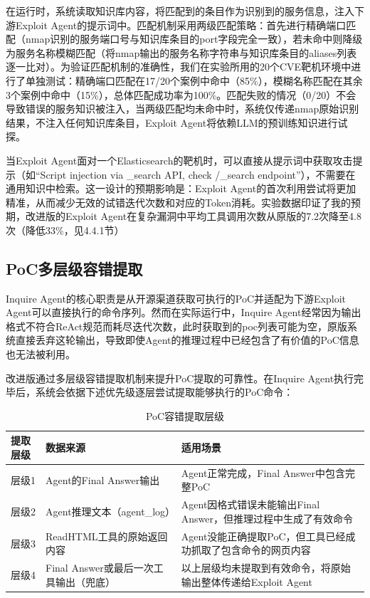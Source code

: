在运行时，系统读取知识库内容，将匹配到的条目作为识别到的服务信息，注入下游Exploit Agent的提示词中。匹配机制采用两级匹配策略：首先进行精确端口匹配（nmap识别的服务端口号与知识库条目的port字段完全一致），若未命中则降级为服务名称模糊匹配（将nmap输出的服务名称字符串与知识库条目的aliases列表逐一比对）。为验证匹配机制的准确性，我们在实验所用的20个CVE靶机环境中进行了单独测试：精确端口匹配在17/20个案例中命中（85\%），模糊名称匹配在其余3个案例中命中（15\%），总体匹配成功率为100\%。匹配失败的情况（0/20）不会导致错误的服务知识被注入，当两级匹配均未命中时，系统仅传递nmap原始识别结果，不注入任何知识库条目，Exploit Agent将依赖LLM的预训练知识进行试探。

当Exploit Agent面对一个Elasticsearch的靶机时，可以直接从提示词中获取攻击提示（如“Script injection via \_search API, check /\_search endpoint”），不需要在通用知识中检索。这一设计的预期影响是：Exploit Agent的首次利用尝试将更加精准，从而减少无效的试错迭代次数和对应的Token消耗。实验数据印证了我的预期，改进版的Exploit Agent在复杂漏洞中平均工具调用次数从原版的7.2次降至4.8次（降低33\%，见4.4.1节）

\subsection{PoC多层级容错提取}

Inquire Agent的核心职责是从开源渠道获取可执行的PoC并适配为下游Exploit Agent可以直接执行的命令序列。然而在实际运行中，Inquire Agent经常因为输出格式不符合ReAct规范而耗尽迭代次数，此时获取到的poc列表可能为空，原版系统直接丢弃这轮输出，导致即使Agent的推理过程中已经包含了有价值的PoC信息也无法被利用。

改进版通过多层级容错提取机制来提升PoC提取的可靠性。在Inquire Agent执行完毕后，系统会依据下述优先级逐层尝试提取能够执行的PoC命令：

\begin{table}[htbp]
\centering
\caption{PoC容错提取层级} \label{tab:ch3:3}
  \renewcommand{\arraystretch}{1.3}
\begin{tabular}{l>{\raggedright\arraybackslash}p{3cm}>{\raggedright\arraybackslash}p{7cm}}
    \toprule
提取层级 & 数据来源 & 适用场景 \\
    \midrule
层级1 & Agent的Final Answer输出 & Agent正常完成，Final Answer中包含完整PoC \\
    \midrule
层级2 & Agent推理文本（agent\_log） & Agent因格式错误未能输出Final Answer，但推理过程中生成了有效命令 \\
    \midrule
层级3 & ReadHTML工具的原始返回内容 & Agent没能正确提取PoC，但工具已经成功抓取了包含命令的网页内容 \\
    \midrule
层级4 & Final Answer或最后一次工具输出（兜底） & 以上层级均未提取到有效命令，将原始输出整体传递给Exploit Agent \\
    \bottomrule
\end{tabular}
\end{table}


